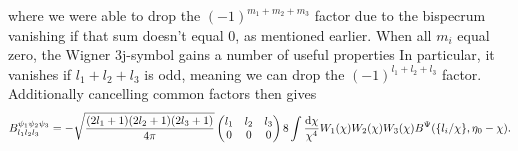 \documentclass[11pt]{article} %
\DeclareRobustCommand{\d}{\ifmmode\text{d}\else d\fi}
\begin{document}
where we were able to drop the $(-1)^{m_1+m_2+m_3}$ factor due to the bispecrum vanishing if that sum doesn't equal $0$, as mentioned earlier. When all $m_i$ equal zero, the Wigner 3j-symbol gains a number of useful properties %
In particular, it vanishes if $l_1+l_2+l_3$ is odd, meaning we can drop the $(-1)^{l_1+l_2+l_3}$ factor. Additionally cancelling common factors then gives
\begin{align}
    B^{\psi_1\psi_2\psi_3}_{l_1l_2l_3}
    =
    -\sqrt{\frac{(2l_1 + 1)(2l_2 + 1)(2l_3 + 1)}{4\pi}} \begin{pmatrix} l_1 & l_2 & l_3 \\ 0 & 0 & 0 \end{pmatrix} 8 \int \frac{\d \chi }{\chi^4} W_1(\chi)W_2(\chi)W_3(\chi) B^\Psi(\{l_i/\chi\}, \eta_0-\chi). \label{eq:lbsintermsofpsi}
\end{align}
\end{document}
